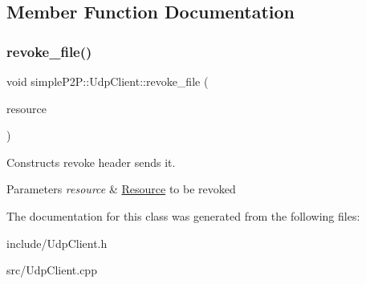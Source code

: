 \subsection{Member Function Documentation}
\mbox{\label{classsimpleP2P_1_1UdpClient_a0dc7645a01f83c3eded8e237b3b49eb1}} 
\subsubsection{\texorpdfstring{revoke\+\_\+file()}{revoke\_file()}}
{\footnotesize\ttfamily void simple\+P2\+P\+::\+Udp\+Client\+::revoke\+\_\+file (\begin{DoxyParamCaption}\item[{\hyperlink{classsimpleP2P_1_1Resource}{simple\+P2\+P\+::\+Resource}}]{resource }\end{DoxyParamCaption})}



Constructs revoke header sends it. 


\begin{DoxyParams}{Parameters}
{\em resource} & \hyperlink{classsimpleP2P_1_1Resource}{Resource} to be revoked \\
\hline
\end{DoxyParams}


The documentation for this class was generated from the following files\+:\begin{DoxyCompactItemize}
\item 
include/Udp\+Client.\+h\item 
src/Udp\+Client.\+cpp\end{DoxyCompactItemize}
